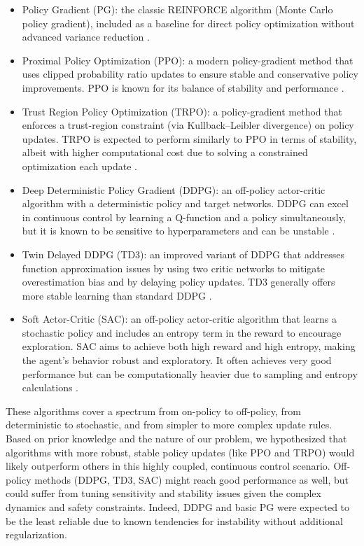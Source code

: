 \documentclass{ieeeaccess}
\begin{document}
\begin{itemize}
  \item Policy Gradient (PG): the classic REINFORCE algorithm (Monte Carlo policy gradient), included as
a baseline for direct policy optimization without advanced variance reduction \cite{b7,b21}.
  \item Proximal Policy Optimization (PPO): a modern policy-gradient method that uses clipped
probability ratio updates to ensure stable and conservative policy improvements. PPO is known
for its balance of stability and performance \cite{b15}.
  \item Trust Region Policy Optimization (TRPO): a policy-gradient method that enforces a trust-region
constraint (via Kullback–Leibler divergence) on policy updates. TRPO is expected to perform similarly to
PPO in terms of stability, albeit with higher computational cost due to solving a constrained
optimization each update \cite{b14}.
  \item Deep Deterministic Policy Gradient (DDPG): an off-policy actor-critic algorithm with a
deterministic policy and target networks. DDPG can excel in continuous control by learning a Q-function 
and a policy simultaneously, but it is known to be sensitive to hyperparameters and can
be unstable \cite{b16}.
  \item Twin Delayed DDPG (TD3): an improved variant of DDPG that addresses function approximation
issues by using two critic networks to mitigate overestimation bias and by delaying policy
updates. TD3 generally offers more stable learning than standard DDPG \cite{b17}.
  \item Soft Actor-Critic (SAC): an off-policy actor-critic algorithm that learns a stochastic policy and
includes an entropy term in the reward to encourage exploration. SAC aims to achieve both
high reward and high entropy, making the agent’s behavior robust and exploratory. It often
achieves very good performance but can be computationally heavier due to sampling and
entropy calculations \cite{b18}.
\end{itemize}        
These algorithms cover a spectrum from on-policy to off-policy, from deterministic to stochastic, and
from simpler to more complex update rules. Based on prior knowledge and the nature of our problem,
we hypothesized that algorithms with more robust, stable policy updates (like PPO and TRPO) would
likely outperform others in this highly coupled, continuous control scenario. Off-policy methods
(DDPG, TD3, SAC) might reach good performance as well, but could suffer from tuning sensitivity and
stability issues given the complex dynamics and safety constraints. Indeed, DDPG and basic PG were
expected to be the least reliable due to known tendencies for instability without additional
regularization.
\end{document}
